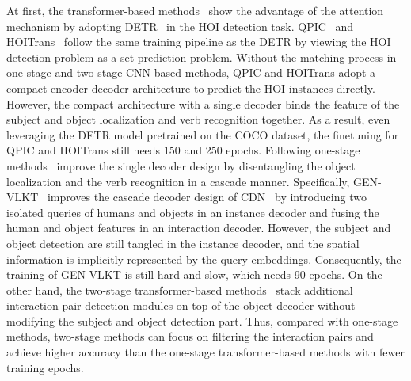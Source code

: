 \documentclass[10pt,twocolumn,letterpaper]{article}
\begin{document}
At first, the transformer-based methods~\cite{tamura2021qpic,zou2021end,chen2021reformulating,kim2021hotr} show the advantage of the attention mechanism by adopting DETR~\cite{carion2020end} in the HOI detection task.
QPIC~\cite{tamura2021qpic} and HOITrans~\cite{zou2021end} follow the same training pipeline as the DETR by viewing the HOI detection problem as a set prediction problem.
Without the matching process in one-stage and two-stage CNN-based methods, QPIC and HOITrans adopt a compact encoder-decoder architecture to predict the HOI instances directly.
However, the compact architecture with a single decoder binds the feature of the subject and object localization and verb recognition together.
As a result, even leveraging the DETR model pretrained on the COCO dataset, the finetuning for QPIC and HOITrans still needs 150 and 250 epochs.
Following one-stage methods~\cite{zhang2021mining,liao2022gen,yuan2022detecting,iftekhar2022look,zhou2022human,yuan2022rlip} improve the single decoder design by disentangling the object localization and the verb recognition in a cascade manner.
Specifically, GEN-VLKT~\cite{liao2022gen} improves the cascade decoder design of CDN~\cite{zhang2021mining} by introducing two isolated queries of humans and objects in an instance decoder and fusing the human and object features in an interaction decoder.
However, the subject and object detection are still tangled in the instance decoder, and the spatial information is implicitly represented by the query embeddings.
Consequently, the training of GEN-VLKT is still hard and slow, which needs 90 epochs.
On the other hand, the two-stage transformer-based methods~\cite{Zhang_2022_CVPR,Liu_2022_CVPR,zhang2022exploring} stack additional interaction pair detection modules on top of the object decoder without modifying the subject and object detection part.
Thus, compared with one-stage methods, two-stage methods can focus on filtering the interaction pairs and achieve higher accuracy than the one-stage transformer-based methods with fewer training epochs.
\end{document}
